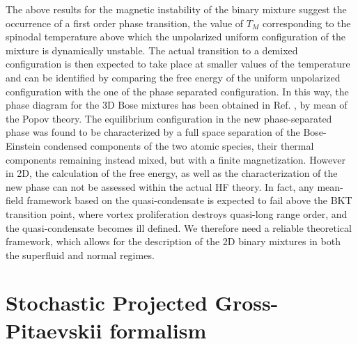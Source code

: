 \documentclass[pra,twocolumn,aps,showpacs,longbibliography]{revtex4-1}
\begin{document}
The above results for the magnetic instability of the binary mixture suggest the occurrence of a first order phase transition, the value of $T_M$ corresponding to the spinodal temperature above which the unpolarized uniform configuration of the mixture is dynamically unstable. The actual  transition to a demixed configuration is then expected to take place at smaller values of the temperature and can be identified by comparing the free energy of the uniform unpolarized configuration  with the one of the phase separated configuration. In this way, the phase diagram for the 3D Bose mixtures has been obtained in Ref. \cite{ota_19}, by mean of the Popov theory. The equilibrium configuration in the new phase-separated phase was found to be characterized by a full space separation of the Bose-Einstein condensed components of the two atomic species, their thermal components remaining instead mixed, but with a finite magnetization. However in 2D, the calculation of the free energy, as well as the characterization of the new phase can not be assessed within the actual HF theory. In fact, any mean-field framework based on the quasi-condensate is expected to fail above the BKT transition point, where vortex proliferation destroys quasi-long range order, and the quasi-condensate becomes ill defined. We therefore need a reliable theoretical framework, which allows for the description of the 2D binary mixtures in both the superfluid and normal regimes.


\section{Stochastic Projected Gross-Pitaevskii formalism}\label{model}
 
\end{document}
